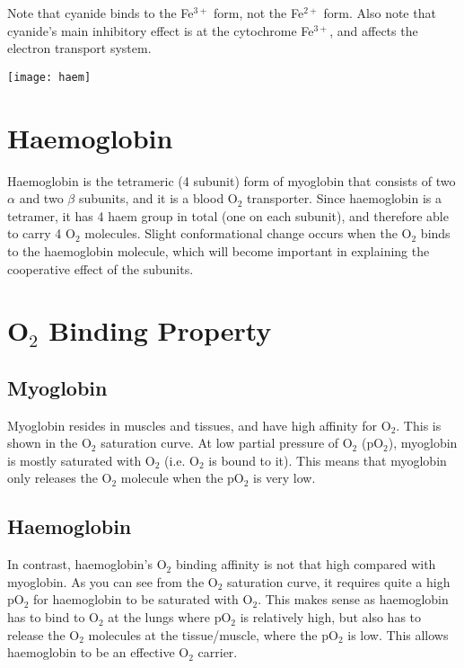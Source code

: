 \documentclass[a4paper, 12pt]{report}
\begin{document}
Note that cyanide binds to the Fe$^{3+}$ form, not the Fe$^{2+}$ form.
Also note that cyanide's main inhibitory effect is at the cytochrome Fe$^{3+}$, and affects the electron transport system.

\begin{center}
\texttt{[image: haem]}
\end{center}

\section{Haemoglobin}

Haemoglobin is the tetrameric (4 subunit) form of myoglobin that consists of two $\alpha$ and two $\beta$ subunits, and it is a blood O$_2$ transporter.
Since haemoglobin is a tetramer, it has 4 haem group in total (one on each subunit), and therefore able to carry 4 O$_2$ molecules.
Slight conformational change occurs when the O$_2$ binds to the haemoglobin molecule, which will become important in explaining the cooperative effect of the subunits.

\section{O$_2$ Binding Property}

\subsection{Myoglobin}

Myoglobin resides in muscles and tissues, and have high affinity for O$_2$.
This is shown in the O$_2$ saturation curve.
At low partial pressure of O$_2$ (pO$_2$), myoglobin is mostly saturated with O$_2$ (i.e. O$_2$ is bound to it).
This means that myoglobin only releases the O$_2$ molecule when the pO$_2$ is very low.

\subsection{Haemoglobin}

In contrast, haemoglobin's O$_2$ binding affinity is not that high compared with myoglobin.
As you can see from the O$_2$ saturation curve, it requires quite a high pO$_2$ for haemoglobin to be saturated with O$_2$.
This makes sense as haemoglobin has to bind to O$_2$ at the lungs where pO$_2$ is relatively high, but also has to release the O$_2$ molecules at the tissue/muscle, where the pO$_2$ is low.
This allows haemoglobin to be an effective O$_2$ carrier.
\end{document}
